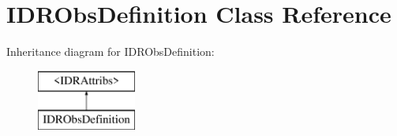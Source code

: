 \hypertarget{interface_i_d_r_obs_definition}{
\section{IDRObsDefinition Class Reference}
\label{interface_i_d_r_obs_definition}
}
Inheritance diagram for IDRObsDefinition:\begin{figure}[H]
\begin{center}
\leavevmode
\includegraphics[height=2.000000cm]{interface_i_d_r_obs_definition}
\end{center}
\end{figure}
